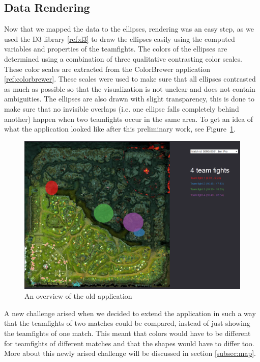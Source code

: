 \documentclass[11pt,twoside,a4paper]{article}
\begin{document}
\subsection{Data Rendering}
\label{subsec:datarendering}
Now that we mapped the data to the ellipses, rendering was an easy step, as we used the D3 library \ref{ref:d3}
 to draw the ellipses easily using the computed variables and properties of the teamfights. The colors of the ellipses are determined using a combination of three qualitative contrasting color scales. These color scales are extracted from the ColorBrewer application \ref{ref:colorbrewer}.
These scales were used to make sure that all ellipses contrasted as much as possible so that the visualization is not unclear and does not contain ambiguities. 
The ellipses are also drawn with slight transparency, this is done to make sure that no invisible overlaps (i.e. one ellipse falls completely behind another) happen when two teamfights occur in the same area.
\newline\newline
To get an idea of what the application looked like after this preliminary work, see Figure~\ref{fig:oldapp}.

\begin{figure}[ht]
\centering
\includegraphics[width=\textwidth]{oldApp.png}
\caption{An overview of the old application}
\label{fig:oldapp}
\end{figure}

A new challenge arised when we decided to extend the application in such a way that the teamfights of two matches could be compared, instead of just showing the teamfights of one match. This meant that colors would have to be different for teamfights of different matches and that the shapes would have to differ too. More about this newly arised challenge will be discussed in section \ref{subsec:map}.
\end{document}
